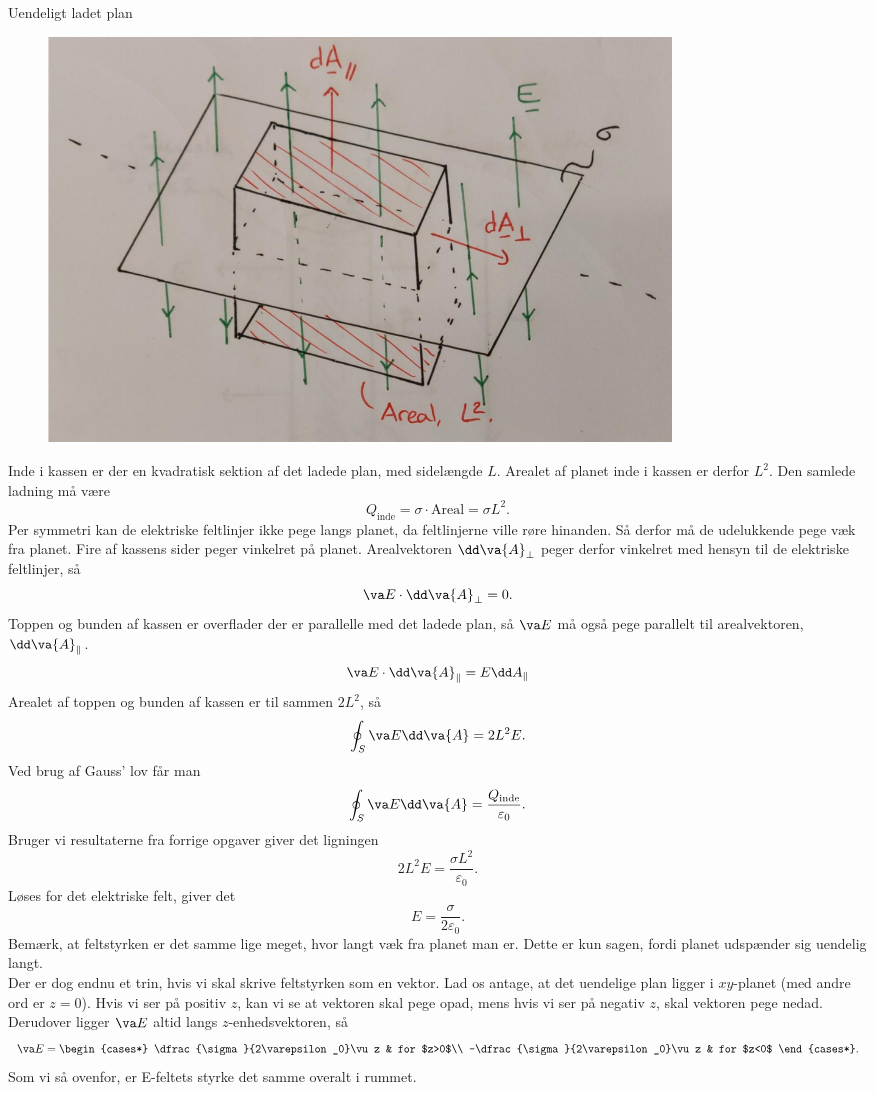 \begin{opgave}{Uendeligt ladet plan}
    \opg
    \begin{figure}[H]
        \centering
        \includegraphics[width=0.8\textwidth]{facit/figurer/elektro/elektro_opg6,1.jpg}
    \end{figure}
    \opg Inde i kassen er der en kvadratisk sektion af det ladede plan, med sidelængde $L$. Arealet af planet inde i kassen er derfor $L^2$. Den samlede ladning må være
    \[ Q_\text{inde}=\sigma\cdot\text{Areal}=\sigma L^2. \]
    \opg Per symmetri kan de elektriske feltlinjer ikke pege langs planet, da feltlinjerne ville røre hinanden. Så derfor må de udelukkende pege væk fra planet.
    \opg Fire af kassens sider peger vinkelret på planet. Arealvektoren $\dd \va {A}_\perp$ peger derfor vinkelret med hensyn til de elektriske feltlinjer, så
    \[ \va E\cdot \dd\va {A}_\perp=0. \]
    Toppen og bunden af kassen er overflader der er parallelle med det ladede plan, så $\va E$ må også pege parallelt til arealvektoren, $\dd \va {A}_\parallel$.
    \[ \va E\cdot \dd\va {A}_\parallel = E\dd A_\parallel \]
    Arealet af toppen og bunden af kassen er til sammen $2L^2$, så
    \[ \oint_S \va E\dd \va {A}=2L^2E. \]
    \opg Ved brug af Gauss' lov får man
    \[ \oint_S\va E\dd \va {A}=\frac{Q_\text{inde}}{\varepsilon_0}. \]
    Bruger vi resultaterne fra forrige opgaver giver det ligningen
    \[ 2L^2E=\frac{\sigma L^2}{\varepsilon_0}. \]
    Løses for det elektriske felt, giver det
    \[ E=\frac{\sigma}{2\varepsilon_0}. \]
    Bemærk, at feltstyrken er det samme lige meget, hvor langt væk fra planet man er. Dette er kun sagen, fordi planet udspænder sig uendelig langt.\\
    Der er dog endnu et trin, hvis vi skal skrive feltstyrken som en vektor. Lad os antage, at det uendelige plan ligger i $xy$-planet (med andre ord er $z=0$). Hvis vi ser på positiv $z$, kan vi se at vektoren skal pege opad, mens hvis vi ser på negativ $z$, skal vektoren pege nedad. Derudover ligger $\va E$ altid langs $z$-enhedsvektoren, så
    \[ \va E=\begin{cases*}
    \dfrac{\sigma}{2\varepsilon_0}\vu z & for $z>0$\\
    -\dfrac{\sigma}{2\varepsilon_0}\vu z & for $z<0$
    \end{cases*}.\]
    \opg Som vi så ovenfor, er E-feltets styrke det samme overalt i rummet.
\end{opgave}


